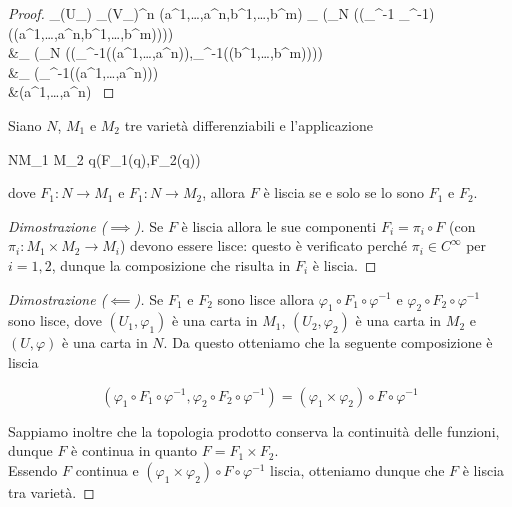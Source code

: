 \begin{proof}
	{\varphi_{\alpha}(U_{\alpha}) \times \psi_{\beta}(V_{\beta})}{\R^{n}}
	{(a^{1},\dots,a^{n},b^{1},\dots,b^{m})}{%
		\varphi_{\alpha} (\pi_{N} ((\varphi_{\alpha}^{-1} \times \psi_{\beta}^{-1}) ((a^{1},\dots,a^{n},b^{1},\dots,b^{m})))) \\
		&\mapsto \varphi_{\alpha} (\pi_{N} ((\varphi_{\alpha}^{-1}((a^{1},\dots,a^{n})),\psi_{\beta}^{-1}((b^{1},\dots,b^{m})))) \\
		&\mapsto \varphi_{\alpha} (\varphi_{\alpha}^{-1}((a^{1},\dots,a^{n}))) \\
		&\mapsto (a^{1},\dots,a^{n})
	}
\end{proof}

\begin{remark}
	Siano $ N $, $ M_{1} $ e $ M_{2} $ tre varietà differenziabili e l'applicazione
	
		{N}{M_{1} \times M_{2}}
		{q}{(F_{1}(q),F_{2}(q))}
	
	dove $ F_{1} : N \to M_{1} $ e $ F_{1} : N \to M_{2} $, allora $ F $ è liscia se e solo se lo sono $ F_{1} $ e $ F_{2} $.
\end{remark}

\begin{proof}[Dimostrazione ($ \implies $)]
	Se $ F $ è liscia allora le sue componenti $ F_{i} = \pi_{i} \circ F $ (con $ \pi_{i} : M_{1} \times M_{2} \to M_{i} $) devono essere lisce: questo è verificato perché $ \pi_{i} \in C^{\infty} $ per $ i=1,2 $, dunque la composizione che risulta in $ F_{i} $ è liscia.
\end{proof}

\begin{proof}[Dimostrazione ($ \impliedby $)]
	Se $ F_{1} $ e $ F_{2} $ sono lisce allora $ \varphi_{1} \circ F_{1} \circ \varphi^{-1} $ e $ \varphi_{2} \circ F_{2} \circ \varphi^{-1} $ sono lisce, dove $ (U_{1},\varphi_{1}) $ è una carta in $ M_{1} $, $ (U_{2},\varphi_{2}) $ è una carta in $ M_{2} $ e $ (U,\varphi) $ è una carta in $ N $. Da questo otteniamo che la seguente composizione è liscia
	
	\begin{equation}
		(\varphi_{1} \circ F_{1} \circ \varphi^{-1}, \varphi_{2} \circ F_{2} \circ \varphi^{-1}) = (\varphi_{1} \times \varphi_{2}) \circ F \circ \varphi^{-1}
	\end{equation}
	
	Sappiamo inoltre che la topologia prodotto conserva la continuità delle funzioni, dunque $ F $ è continua in quanto $ F = F_{1} \times F_{2} $. \\
	Essendo $ F $ continua e $ (\varphi_{1} \times \varphi_{2}) \circ F \circ \varphi^{-1} $ liscia, otteniamo dunque che $ F $ è liscia tra varietà.
\end{proof}

